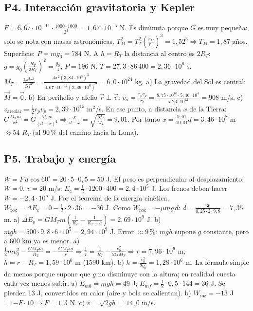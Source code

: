 \documentclass[11pt,a4paper]{article}
\begin{document}
\subsection*{P4. Interacción gravitatoria y Kepler}
\begin{enumerate}[leftmargin=1.4cm,itemsep=4pt]
 $F=6{,}67\cdot10^{-11}\cdot\frac{1000\cdot1000}{2^2}=1{,}67\cdot10^{-5}$ N. Es diminuta porque $G$ es muy pequeña: solo se nota con masas astronómicas.
 $T_M^2=T_T^2\left(\frac{r_M}{r_T}\right)^3=1{,}52^3\Rightarrow T_M=1{,}87$ años.
 Superficie: $P=mg_0=784$ N. A $h=R_T$ la distancia al centro es $2R_T$: $g=g_0\left(\frac{R_T}{2R_T}\right)^2=\frac{g_0}{4}$, $P=196$ N.
 $T=27{,}3\cdot86\,400=2{,}36\cdot10^6$ s. $M_T=\frac{4\pi^2r^3}{GT^2}=\frac{4\pi^2(3{,}84\cdot10^8)^3}{6{,}67\cdot10^{-11}(2{,}36\cdot10^6)^2}=6{,}0\cdot10^{24}$ kg.
 a) La gravedad del Sol es central: $\vec M=\vec 0$. b) En perihelio y afelio $\vec r\perp\vec v$: $v_a=\frac{r_pv_p}{r_a}=\frac{8{,}75\cdot10^{10}\cdot5{,}46\cdot10^4}{5{,}26\cdot10^{12}}=908$ m/s. c) $v_{\text{areolar}}=\frac12r_pv_p=2{,}39\cdot10^{15}$ m$^2$/s.
 En ese punto, a distancia $x$ de la Tierra: $G\frac{M_Tm}{x^2}=G\frac{M_Lm}{(d-x)^2}\Rightarrow\frac{x}{d-x}=\sqrt{\frac{M_T}{M_L}}=9{,}01$. Por tanto $x=\frac{9{,}01}{10{,}01}d=3{,}46\cdot10^8$ m $\approx54$ $R_T$ (al 90\,\% del camino hacia la Luna).
\end{enumerate}

\subsection*{P5. Trabajo y energía}
\begin{enumerate}[leftmargin=1.4cm,itemsep=4pt]
 $W=F\,d\cos60^\circ=20\cdot5\cdot0{,}5=50$ J. El peso es perpendicular al desplazamiento: $W=0$.
 $v=20$ m/s: $E_c=\frac12\cdot1200\cdot400=2{,}4\cdot10^5$ J. Los frenos deben hacer $W=-2{,}4\cdot10^5$ J.
 Por el teorema de la energía cinética, $W_{\text{roz}}=\Delta E_c=0-\frac12\cdot2\cdot36=-36$ J. Como $W_{\text{roz}}=-\mu mg\,d$: $d=\frac{36}{0{,}25\cdot2\cdot9{,}8}=7{,}35$ m.
 a) $\Delta E_p=GM_Tm\left(\frac1{R_T}-\frac1{R_T+h}\right)=2{,}69\cdot10^9$ J. b) $mgh=500\cdot9{,}8\cdot6\cdot10^5=2{,}94\cdot10^9$ J. Error $\approx9$\,\%: $mgh$ supone $g$ constante, pero a 600 km ya es menor.
 a) $\frac12mv_0^2-\frac{GM_Tm}{R_T}=-\frac{GM_Tm}{r}\Rightarrow\frac1r=\frac1{R_T}-\frac{v_0^2}{2GM_T}\Rightarrow r=7{,}96\cdot10^6$ m; $h=r-R_T=1{,}59\cdot10^6$ m (1590 km). b) $h=\frac{v_0^2}{2g_0}=1{,}28\cdot10^6$ m. La fórmula simple da menos porque supone que $g$ no disminuye con la altura; en realidad cuesta cada vez menos subir.
 a) $E_{m0}=mgh=49$ J; $E_{mf}=\frac12\cdot0{,}5\cdot144=36$ J. Se pierden 13 J, convertidos en calor (aire y bola se calientan). b) $W_{\text{roz}}=-13$ J $=-F\cdot10\Rightarrow F=1{,}3$ N. c) $v=\sqrt{2gh}=14{,}0$ m/s.
\end{enumerate}
\end{document}
